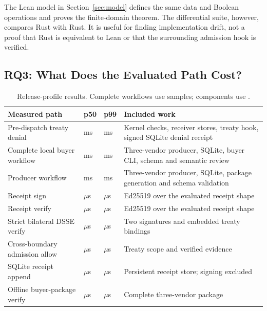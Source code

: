 The Lean model in Section~\ref{sec:model} defines the same data and Boolean
operations and proves the finite-domain theorem. The differential suite,
however, compares Rust with Rust. It is useful for finding implementation
drift, not a proof that Rust is equivalent to Lean or that the surrounding
admission hook is verified.

\subsection{RQ3: What Does the Evaluated Path Cost?}

\begin{table}[t]
\caption{Release-profile results. Complete workflows use \PSPathSampleCount{} samples; components use \PSCriterionSampleCount{}.}
\label{tab:evaluation}
\scriptsize
\begin{tabularx}{\textwidth}{@{}>{\raggedright\arraybackslash}p{}>{\raggedleft\arraybackslash}p{}>{\raggedleft\arraybackslash}p{}>{\raggedright\arraybackslash}X@{}}
\toprule
Measured path & p50 & p99 & Included work \\
\midrule
Pre-dispatch treaty denial
& \PSPredispatchDenyPFiftyMs{} ms & \PSPredispatchDenyPNinetyNineMs{} ms
& Kernel checks, receiver stores, treaty hook, signed SQLite denial receipt \\
Complete local buyer workflow
& \PSBuyerWorkflowPFiftyMs{} ms & \PSBuyerWorkflowPNinetyNineMs{} ms
& Three-vendor producer, SQLite, buyer CLI, schema and semantic review \\
Producer workflow
& \PSProducerPFiftyMs{} ms & \PSProducerPNinetyNineMs{} ms
& Three-vendor producer, SQLite, package generation and schema validation \\
\midrule
Receipt sign
& \PSReceiptSignPFiftyUs{} \(\mu\)s & \PSReceiptSignPNinetyNineUs{} \(\mu\)s
& Ed25519 over the evaluated receipt shape \\
Receipt verify
& \PSReceiptVerifyPFiftyUs{} \(\mu\)s & \PSReceiptVerifyPNinetyNineUs{} \(\mu\)s
& Ed25519 over the evaluated receipt shape \\
Strict bilateral DSSE verify
& \PSBilateralVerifyPFiftyUs{} \(\mu\)s & \PSBilateralVerifyPNinetyNineUs{} \(\mu\)s
& Two signatures and embedded treaty bindings \\
Cross-boundary admission allow
& \PSCrossBoundaryPFiftyUs{} \(\mu\)s & \PSCrossBoundaryPNinetyNineUs{} \(\mu\)s
& Treaty scope and verified evidence \\
SQLite receipt append
& \PSReceiptAppendPFiftyUs{} \(\mu\)s & \PSReceiptAppendPNinetyNineUs{} \(\mu\)s
& Persistent receipt store; signing excluded \\
Offline buyer-package verify
& \PSBuyerVerifyPFiftyUs{} \(\mu\)s & \PSBuyerVerifyPNinetyNineUs{} \(\mu\)s
& Complete three-vendor package \\
\bottomrule
\end{tabularx}
\end{table}


